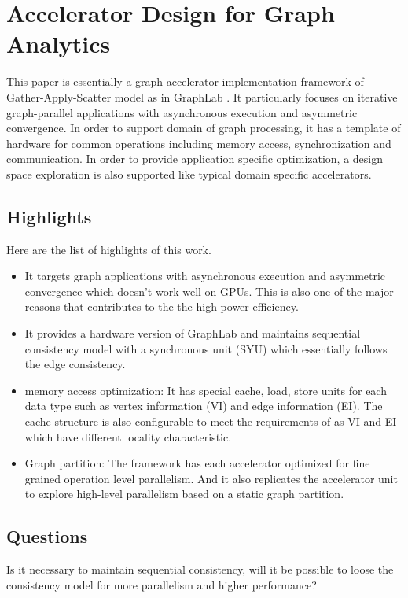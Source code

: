 \section{Accelerator Design for Graph Analytics}
This paper \cite{ozdal2016energy} is essentially a graph accelerator implementation framework of Gather-Apply-Scatter model as in GraphLab \cite{nurvitadhi2014graphgen}. It particularly focuses on iterative graph-parallel applications with asynchronous
execution and asymmetric convergence. In order to support domain of graph processing, it has a
template of hardware for common operations including memory access, synchronization and
communication. In order to provide application specific optimization, a design space exploration is
also supported like typical domain specific accelerators.

\subsection{Highlights}
Here are the list of highlights of this work.
\begin{itemize}
    \item It targets graph applications with asynchronous execution and asymmetric convergence which
        doesn't work well on GPUs. This is also one of the major reasons that contributes to the the high power efficiency.
    \item It provides a hardware version of GraphLab \cite{nurvitadhi2014graphgen} and maintains sequential consistency model with a synchronous unit (SYU) which essentially follows the edge consistency. 
    \item memory access optimization: It has special cache, load, store units for each data type such as vertex information (VI) and edge information (EI). The cache structure is also configurable to meet the requirements of as VI and EI which have different locality characteristic. 
    \item Graph partition: The framework has each accelerator optimized for fine grained operation level parallelism. And it also replicates the accelerator unit to explore high-level parallelism based on a static graph partition.
\end{itemize}

\subsection{Questions}
Is it necessary to maintain sequential consistency, will it be possible to loose the consistency model for more parallelism and higher performance?

